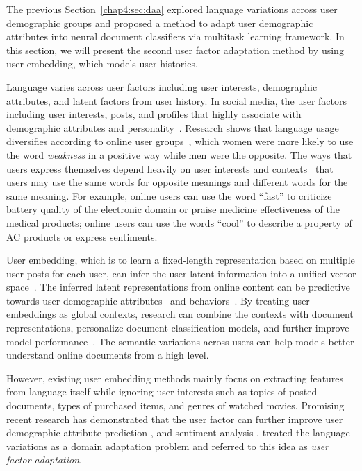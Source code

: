 The previous Section~\ref{chap4:sec:daa} explored language variations across user demographic groups and proposed a method to adapt user demographic attributes into neural document classifiers via multitask learning framework.
In this section, we will present the second user factor adaptation method by using user embedding, which models user histories.


Language varies across user factors including user interests, demographic attributes, and latent factors from user history.
In social media, the user factors including user interests, posts, and profiles that highly associate with demographic attributes and personality~\cite{lynn2017human}.
Research shows that language usage diversifies according to online user groups~\cite{volkova2013exploring}, which women were more likely to use the word \textit{weakness} in a positive way while men were the opposite.
The ways that users express themselves depend heavily on user interests and contexts~\cite{oba2019modeling} that users may use the same words for opposite meanings and different words for the same meaning.
For example, online users can use the word ``fast'' to criticize battery quality of the electronic domain or praise medicine effectiveness of the medical products; online users can use the words ``cool'' to describe a property of AC products or express sentiments.

User embedding, which is to learn a fixed-length representation based on multiple user posts for each user, can infer the user latent information into a unified vector space~\cite{benton2018learning, pan2019social}.
The inferred latent representations from online content can be predictive towards user demographic attributes~\cite{volkova2015inferring, wang2018cross, farnadi2018user, lynn2020hierarchical} and behaviors~\cite{amir2017quantifying, benton2017multitask, ding2017multi}.
By treating user embeddings as global contexts, research can combine the contexts with document representations, personalize document classification models, and further improve model performance~\cite{tang2015learning, chen2016neural, yang2017overcoming, wu2018improving, zeng2019joint, huang2019deep}.
The semantic variations across users can help models better understand online documents from a high level.

However, existing user embedding methods \cite{amir2016modelling, benton2016learning, xing2017incorporating, pan2019social} mainly focus on extracting features from language itself while ignoring user interests such as topics of posted documents, types of purchased items, and genres of watched movies.
Promising recent research has demonstrated that the user factor can further improve user demographic attribute prediction \cite{farnadi2018user}, and sentiment analysis \cite{yang2017overcoming}.
\cite{lynn2017human} treated the language variations as a domain adaptation problem and referred to this idea as \textit{user factor adaptation}.

